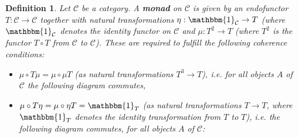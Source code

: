 \documentclass[11pt]{report}
\newcommand{\mcC}{\mathcal{C}}
\newtheorem{defn}[thm]{Definition} %
\begin{document}
\begin{defn}
  Let $\mcC$ be a category. A \textbf{monad }on $\mcC$ is given by an endofunctor $T: \mcC \to \mcC$ together with natural transformations $\eta: \mathbbm{1}_\mcC \to T$ (where $\mathbbm{1}_\mcC$ denotes the identity functor on $\mcC$ and
  $\mu: T^2 \to T$ (where $T^2$ is the functor $T \circ T$ from $\mcC$ to $\mcC$). These are required to fulfill the following coherence conditions:
  \begin{itemize}
  \item $\mu \circ T \mu = \mu \circ \mu T$ (as natural transformations $T^3 \to T$), i.e. for all objects $A$ of $\mcC$ the following diagram commutes,
    \begin{center}
    \end{center} 
    \begin{center}
    \end{center} 
  \item $\mu \circ T \eta = \mu \circ \eta T = \mathbbm{1}_T $ (as natural transformations  $T \to T$, where $\mathbbm{1}_T$ denotes the identity transformation from $T$ to $T$), i.e.
    the following diagram commutes, for all objects $A$ of $\mcC$:
    \begin{center}
    \end{center} 
    \begin{center}
    \end{center} 

  \end{itemize}
\end{defn}
\end{document}
